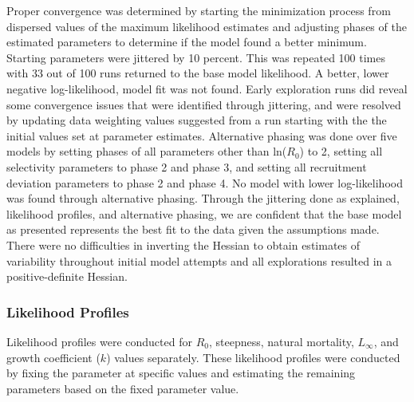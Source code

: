 \documentclass[11pt,
  english,
  a4paper,
]{article}
\begin{document}
Proper convergence was determined by starting the minimization process from dispersed values of the maximum likelihood estimates and adjusting phases of the estimated parameters to determine if the model found a better minimum. Starting parameters were jittered by 10 percent. This was repeated 100 times with 33 out of 100 runs returned to the base model likelihood. A better, lower negative log-likelihood, model fit was not found. Early exploration runs did reveal some convergence issues that were identified through jittering, and were resolved by updating data weighting values suggested from a run starting with the the initial values set at parameter estimates. Alternative phasing was done over five models by setting phases of all parameters other than ln({\(R_0\)\leavevmode\tagmcend\tagstructend}) to 2, setting all selectivity parameters to phase 2 and phase 3, and setting all recruitment deviation parameters to phase 2 and phase 4. No model with lower log-likelihood was found through alternative phasing. Through the jittering done as explained, likelihood profiles, and alternative phasing, we are confident that the base model as presented represents the best fit to the data given the assumptions made. There were no difficulties in inverting the Hessian to obtain estimates of variability throughout initial model attempts and all explorations resulted in a positive-definite Hessian.

\leavevmode\tagmcend\tagstructend\par


\hypertarget{likelihood-profiles}{%
\subsubsection{Likelihood Profiles}\label{likelihood-profiles}}

\leavevmode\tagmcend\tagstructend


Likelihood profiles were conducted for {\(R_0\)\leavevmode\tagmcend\tagstructend}, steepness, natural mortality, {\(L_{\infty}\)\leavevmode\tagmcend\tagstructend}, and growth coefficient ({\(k\)\leavevmode\tagmcend\tagstructend}) values separately. These likelihood profiles were conducted by fixing the parameter at specific values and estimating the remaining parameters based on the fixed parameter value.
\end{document}

